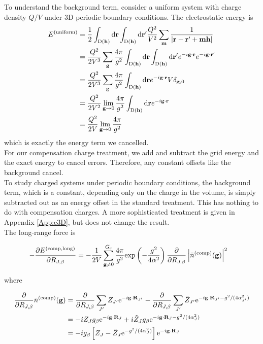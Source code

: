 \documentclass[paper=a4, fontsize=11pt]{article} %
\numberwithin{equation}{section} %
\numberwithin{figure}{section} %
\numberwithin{table}{section} %
\newcommand{\p}{\partial}
\newcommand{\bh}{{\bf{h}}}
\newcommand{\bm}{{\bf{m}}}
\newcommand{\bg}{{\bf{g}}}
\newcommand{\br}{{\bf{r}}}
\newcommand{\bR}{{\bf{R}}}
\newcommand{\rexp}{{\mathrm{exp}}}
\newcommand{\re}{{\mathrm{e}}}
\newcommand{\rlong}{{\mathrm{long}}}
\newcommand{\rd}{{\mathrm{d}}}
\newcommand{\rD}{{\mathrm{D}}}
\newcommand{\rcomp}{{\mathrm{comp}}}
\newcommand{\ibgR}{i\bg\cdot\bR}
\newcommand{\al}{{\alpha}}
\newcommand{\RJb}{{R_{J,\beta}}}
\newcommand{\Gc}{{G_{\mathrm{c}}}}
\newcommand{\bal}{{\bar{\alpha}}}
\begin{document}
To understand the background term, consider a uniform system with charge density $Q/V$ under 3D periodic boundary conditions. The electrostatic energy is
\begin{equation}
\begin{split}
E^{(\mathrm{uniform})}
&= \frac{1}{2} \int_{\rD(\bh)} \rd \br \int_{\rD(\bh)} \rd \br' \frac{Q^2}{V^2} \sum_{\bm} \frac{1}{|\br - \br' + \bm\bh|}\\
&= \frac{Q^2}{2V^3} \sum_{\bg} \frac{4\pi}{g^2}\int_{\rD(\bh)} \rd \br \int_{\rD(\bh)} \rd \br' e^{-i\bg\cdot \br} e^{-i\bg\cdot \br'}\\
&= \frac{Q^2}{2V^3} \sum_{\bg} \frac{4\pi}{g^2}\int_{\rD(\bh)}\rd \br e^{-i\bg\cdot \br} V \delta_{\bg,0}\\
&= \frac{Q^2}{2V^2} \lim_{\bg \rightarrow 0} \frac{4\pi}{g^2}\int_{\rD(\bh)}\rd \br e^{-i\bg\cdot \br}\\
&= \frac{Q^2}{2V} \lim_{\bg \rightarrow 0} \frac{4\pi}{g^2}
\end{split}
\end{equation}
which is exactly the energy term we cancelled.\\

For our compensation charge treatment, we add and subtract the grid energy and the exact energy to cancel errors. Therefore, any constant offsets like the background cancel. \\

To study charged systems under periodic boundary conditions, the background term, which is a constant, depending only on the charge in the volume, is simply subtracted out as an energy offset in the standard treatment. This has nothing to do with compensation charges. A more sophisticated treatment is given in Appendix \ref{App:c3D}, but does not change the result.\\

The long-range force is

\begin{equation}
\begin{split}
-\frac{\p E^{(\rcomp,\rlong)}}{\p \RJb}
&= -\frac{1}{2V} \sum_{\bg \neq 0}^{\Gc} \frac{4\pi}{g^2} \rexp\left(-\frac{g^2}{4\bal^2}\right) \frac{\p}{\p \RJb}\left|\bar n ^{(\rcomp)}(\bg)\right|^2 
\end{split}
\end{equation}

where

\begin{equation}
\begin{split}
\frac{\p}{\p \RJb} \bar n ^{(\rcomp)}(\bg)
&= \frac{\p}{\p \RJb} \sum_{J'} Z_{J'} \re^{-\ibgR_{J'}} -  \frac{\p}{\p \RJb} \sum_{J'} \tilde Z_{J'} \re^{-\ibgR_{J'} - g^2/(4\al_{J'}^2)}\\
&= -iZ_J g_{\beta} \re^{-\ibgR_{J}} + i\tilde Z_J g_{\beta} \re^{-\ibgR_{J}- g^2/(4\al_{J}^2)} \\
&= -ig_{\beta}\left[Z_J - \tilde Z_J\re^{- g^2/(4\al_{J}^2)}\right]\re^{-\ibgR_{J}}
\end{split}
\end{equation}
\end{document}
